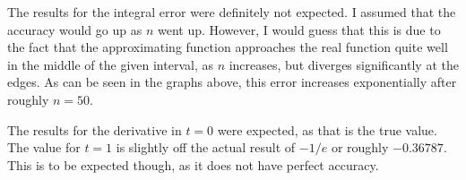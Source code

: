 The results for the integral error were definitely not expected. I assumed that the accuracy would go up as $n$ went up. However, I would guess that this is due to the fact that the approximating function approaches the real function quite well in the middle of the given interval, as $n$ increases, but diverges significantly at the edges. As can be seen in the graphs above, this error increases exponentially after roughly $n = 50$.

The results for the derivative in $t=0$ were expected, as that is the true value. The value for $t=1$ is slightly off the actual result of $-1/e$ or roughly $-0.36787$. This is to be expected though, as it does not have perfect accuracy.
